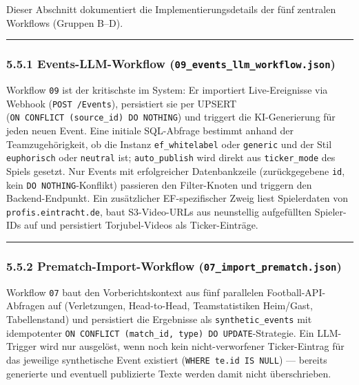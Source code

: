 Dieser Abschnitt dokumentiert die Implementierungsdetails der fünf
zentralen Workflows (Gruppen B--D).

\begin{center}\rule{0.5\linewidth}{0.5pt}\end{center}

\subsubsection{\texorpdfstring{5.5.1 Events-LLM-Workflow
(\texttt{09\_events\_llm\_workflow.json})}{5.5.1 Events-LLM-Workflow (09\_events\_llm\_workflow.json)}}\label{events-llm-workflow-09_events_llm_workflow.json}

Workflow \texttt{09} ist der kritischste im System: Er importiert
Live-Ereignisse via Webhook (\texttt{POST\ /Events}), persistiert sie
per UPSERT (\texttt{ON\ CONFLICT\ (source\_id)\ DO\ NOTHING}) und
triggert die KI-Generierung für jeden neuen Event. Eine initiale
SQL-Abfrage bestimmt anhand der Teamzugehörigkeit, ob die Instanz
\texttt{ef\_whitelabel} oder \texttt{generic} und der Stil
\texttt{euphorisch} oder \texttt{neutral} ist; \texttt{auto\_publish}
wird direkt aus \texttt{ticker\_mode} des Spiels gesetzt. Nur Events mit
erfolgreicher Datenbankzeile (zurückgegebene \texttt{id}, kein
\texttt{DO\ NOTHING}-Konflikt) passieren den Filter-Knoten und triggern
den Backend-Endpunkt. Ein zusätzlicher EF-spezifischer Zweig liest
Spielerdaten von \texttt{profis.eintracht.de}, baut S3-Video-URLs aus
neunstellig aufgefüllten Spieler-IDs auf und persistiert Torjubel-Videos
als Ticker-Einträge.

\begin{center}\rule{0.5\linewidth}{0.5pt}\end{center}

\subsubsection{\texorpdfstring{5.5.2 Prematch-Import-Workflow
(\texttt{07\_import\_prematch.json})}{5.5.2 Prematch-Import-Workflow (07\_import\_prematch.json)}}\label{prematch-import-workflow-07_import_prematch.json}

Workflow \texttt{07} baut den Vorberichtskontext aus fünf parallelen
Football-API-Abfragen auf (Verletzungen, Head-to-Head, Teamstatistiken
Heim/Gast, Tabellenstand) und persistiert die Ergebnisse als
\texttt{synthetic\_events} mit idempotenter
\texttt{ON\ CONFLICT\ (match\_id,\ type)\ DO\ UPDATE}-Strategie. Ein
LLM-Trigger wird nur ausgelöst, wenn noch kein nicht-verworfener
Ticker-Eintrag für das jeweilige synthetische Event existiert
(\texttt{WHERE\ te.id\ IS\ NULL}) --- bereits generierte und eventuell
publizierte Texte werden damit nicht überschrieben.

